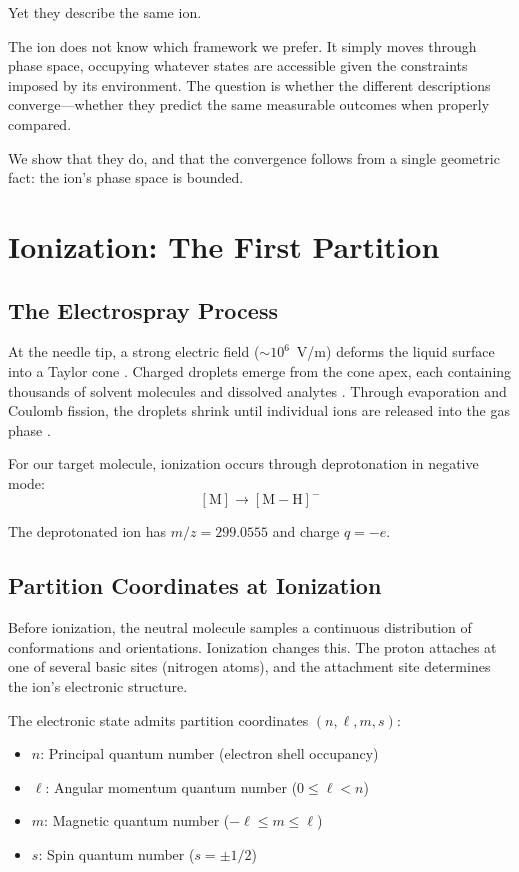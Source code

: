 \documentclass[twocolumn,10pt]{article}
\theoremstyle{remark}
\begin{document}
Yet they describe the same ion.

The ion does not know which framework we prefer. It simply moves through phase space, occupying whatever states are accessible given the constraints imposed by its environment. The question is whether the different descriptions converge---whether they predict the same measurable outcomes when properly compared.

We show that they do, and that the convergence follows from a single geometric fact: the ion's phase space is bounded.


\section{Ionization: The First Partition}
\label{sec:ionization}

\subsection{The Electrospray Process}

At the needle tip, a strong electric field ($\sim 10^6$~V/m) deforms the liquid surface into a Taylor cone \cite{taylor1964disintegration}. Charged droplets emerge from the cone apex, each containing thousands of solvent molecules and dissolved analytes \cite{fenn1989electrospray}. Through evaporation and Coulomb fission, the droplets shrink until individual ions are released into the gas phase \cite{kebarle2009electrospray}.

For our target molecule, ionization occurs through deprotonation in negative mode:
\begin{equation}
\mathrm{[M]} \to \mathrm{[M - H]}^{-}
\end{equation}

The deprotonated ion has $m/z = 299.0555$ and charge $q = -e$.

\subsection{Partition Coordinates at Ionization}

Before ionization, the neutral molecule samples a continuous distribution of conformations and orientations. Ionization changes this. The proton attaches at one of several basic sites (nitrogen atoms), and the attachment site determines the ion's electronic structure.

The electronic state admits partition coordinates $(n, \ell, m, s)$:
\begin{itemize}
    \item $n$: Principal quantum number (electron shell occupancy)
    \item $\ell$: Angular momentum quantum number ($0 \leq \ell < n$)
    \item $m$: Magnetic quantum number ($-\ell \leq m \leq \ell$)
    \item $s$: Spin quantum number ($s = \pm 1/2$)
\end{itemize}
\end{document}
